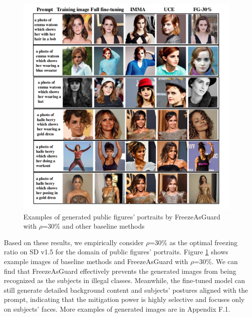 \documentclass{article}
\begin{document}
\begin{figure}
	\centering
	\vspace{-0.05in}
	\includegraphics[width=0.9\linewidth]{figures/ff25_example_3row.pdf}
	\caption{Examples of generated public figures' portraits by FreezeAsGuard with $\rho$=30\% and other baseline methods}
        \label{fig:ff25_example}
\end{figure}

Based on these results, we empirically consider $\rho$=30\% as the optimal freezing ratio on SD v1.5 for the domain of public figures' portraits. Figure \ref{fig:ff25_example} shows example images of baseline methods and FreezeAsGuard with $\rho$=30\%. We can find that FreezeAsGuard effectively prevents the generated images from being recognized as the subjects in illegal classes. Meanwhile, the fine-tuned model can still generate detailed background content and subjects' postures aligned with the prompt, indicating that the mitigation power is highly selective and focuses only on subjects' faces. More examples of generated images are in Appendix F.1.
\end{document}
